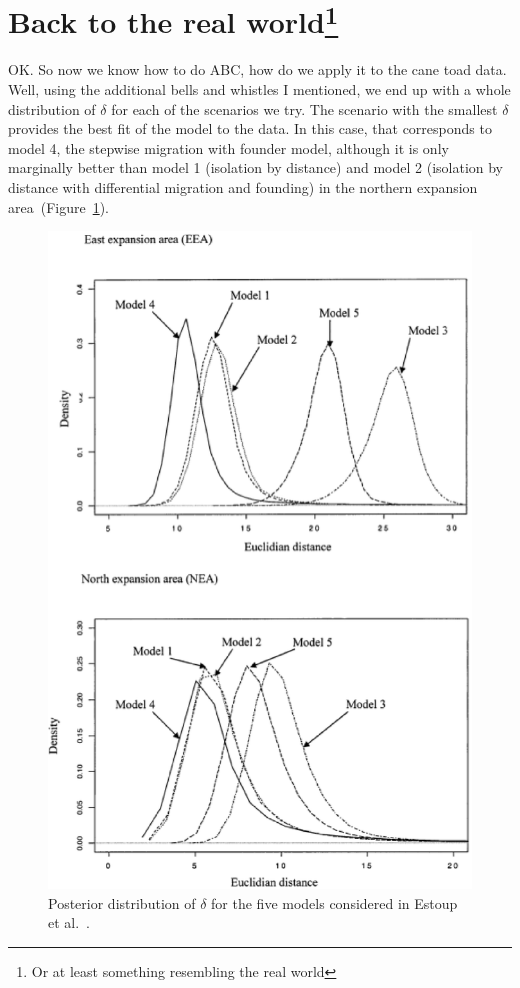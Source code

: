 \documentclass[12pt]{article}
\begin{document}
\section*{Back to the real world\footnote{Or at least something
    resembling the real world}}

OK. So now we know how to do ABC, how do we apply it to the cane toad
data. Well, using the additional bells and whistles I mentioned, we
end up with a whole distribution of $\delta$ for each of the scenarios
we try. The scenario with the smallest $\delta$ provides the best fit
of the model to the data. In this case, that corresponds to model 4,
the stepwise migration with founder model, although it is only
marginally better than model 1 (isolation by distance) and model 2
(isolation by distance with differential migration and founding) in
the northern expansion area~(Figure~\ref{fig:cane-toad-models}).

\begin{figure}
\begin{center}
\includegraphics[width=4.5in]{cane-toad-models.eps}
\end{center}
\caption{Posterior distribution of $\delta$ for the five models
  considered in Estoup et al.~\cite{Estoup-etal-2004}.}\label{fig:cane-toad-models}
\end{figure}
\end{document}
